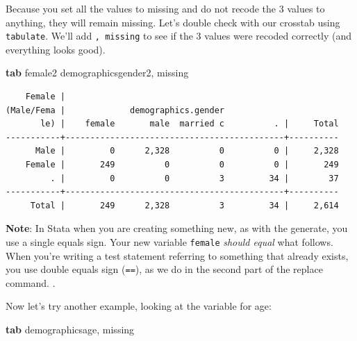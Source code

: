 \documentclass[
]{book}
\newenvironment{Shaded}{\begin{snugshade}}{\end{snugshade}}
\newcommand{\FunctionTok}[1]{\textcolor[rgb]{0.00,0.00,0.00}{#1}}
\newcommand{\KeywordTok}[1]{\textcolor[rgb]{0.13,0.29,0.53}{\textbf{#1}}}
\newcommand{\NormalTok}[1]{#1}
\begin{document}
Because you set all the values to missing and do not recode the 3 values to anything, they will remain missing. Let's double check with our crosstab using \texttt{tabulate}. We'll add \texttt{,\ missing} to see if the 3 values were recoded correctly (and everything looks good).

\begin{Shaded}
\begin{Highlighting}[]
\KeywordTok{tab}\NormalTok{ female2 demographicsgender2, }\FunctionTok{missing}
\end{Highlighting}
\end{Shaded}

\begin{verbatim}
    Female |
(Male/Fema |             demographics.gender
       le) |    female       male  married c          . |     Total
-----------+--------------------------------------------+----------
      Male |         0      2,328          0          0 |     2,328 
    Female |       249          0          0          0 |       249 
         . |         0          0          3         34 |        37 
-----------+--------------------------------------------+----------
     Total |       249      2,328          3         34 |     2,614 
\end{verbatim}

\textbf{Note}: In Stata when you are creating something new, as with the generate, you use a single equals sign. Your new variable \texttt{female} \emph{should equal} what follows. When you're writing a test statement referring to something that already exists, you use double equals sign (\texttt{==}), as we do in the second part of the replace command. .

Now let's try another example, looking at the variable for age:

\begin{Shaded}
\begin{Highlighting}[]
\KeywordTok{tab}\NormalTok{ demographicsage, }\FunctionTok{missing}
\end{Highlighting}
\end{Shaded}
\end{document}
